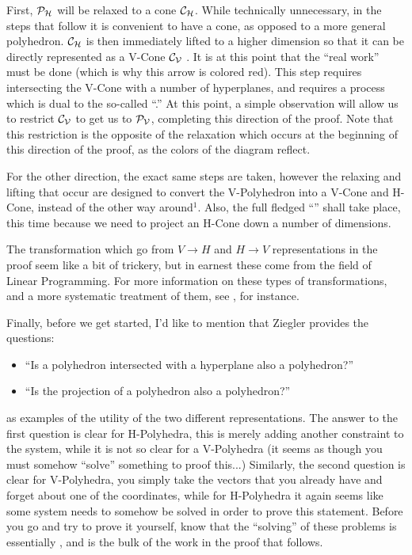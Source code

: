 \documentclass[a4,fleqn]{article}
\begin{document}
First, $\mathcal{P}_{\mathcal{H}}$ will be relaxed to a cone $\mathcal{C}_{\mathcal{H}}$.  While technically unnecessary, in the steps that follow it is convenient to have a cone, as opposed to a more general polyhedron.  $\mathcal{C}_{\mathcal{H}}$ is then immediately lifted to a higher dimension so that it can be directly represented as a V-Cone $\mathcal{C}_{\mathcal{V}}$ .  It is at this point that the ``real work'' must be done (which is why this arrow is colored red).  This step requires intersecting the V-Cone with a number of hyperplanes, and requires a process which is dual to the so-called ``\FME.''  At this point, a simple observation will allow us to restrict $\mathcal{C}_{\mathcal{V}}$ to get us to $\mathcal{P}_{\mathcal{V}}$, completing this direction of the proof.  Note that this restriction is the opposite of the relaxation which occurs at the beginning of this direction of the proof, as the colors of the diagram reflect.

For the other direction, the exact same steps are taken, however the relaxing and lifting that occur are designed to convert the V-Polyhedron into a V-Cone and H-Cone, instead of the other way around$^1$.  Also, the full fledged ``\FME'' shall take place, this time because we need to project an H-Cone down a number of dimensions.

The transformation which go from $V \to H$ and $H \to V$ representations in the proof seem like a bit of trickery, but in earnest these come from the field of Linear Programming.  For more information on these types of transformations, and a more systematic treatment of them, see , for instance.

\medskip
Finally, before we get started, I'd like to mention that Ziegler provides the questions:
\begin{itemize}
  \item ``Is a polyhedron intersected with a hyperplane also a polyhedron?''
  \item ``Is the projection of a polyhedron also a polyhedron?''
\end{itemize}
as examples of the utility of the two different representations.  The answer to the first question is clear for H-Polyhedra, this is merely adding another constraint to the system, while it is not so clear for a V-Polyhedra (it seems as though you must somehow ``solve'' something to proof this...)  Similarly, the second question is clear for V-Polyhedra, you simply take the vectors that you already have and forget about one of the coordinates, while for H-Polyhedra it again seems like some system needs to somehow be solved in order to prove this statement.  Before you go and try to prove it yourself, know that the ``solving'' of these problems is essentially \FME, and is the bulk of the work in the proof that follows.
\end{document}
